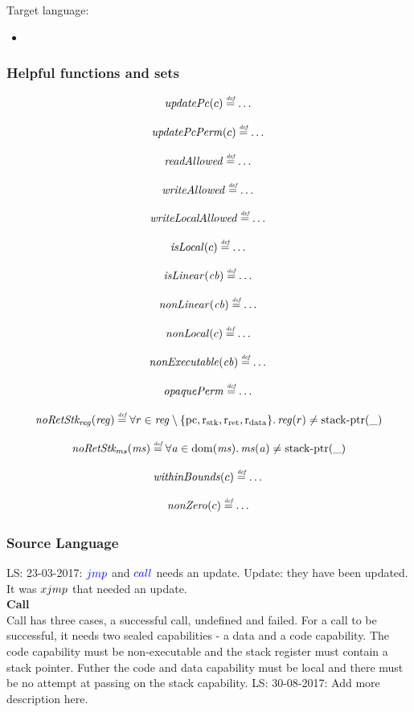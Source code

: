 \documentclass[a4paper]{article}
\newcommand\lau[1]{{\color{purple} \sf \footnotesize {LS: #1}}\\}
\newcommand{\defeq}{\stackrel{\textit{\tiny{def}}}{=}}
\newcommand{\dom}{\mathrm{dom}}
\newcommand{\sourcecolor}[1]{\color{blue}}
\newcommand{\src}[1]{{\sourcecolor{} #1}}
\newcommand{\targetcolor}[1]{\color{black}}
\newcommand{\trg}[1]{{\targetcolor{} #1}}
\newcommand{\zinstr}[1]{#1}
\newcommand{\oneinstr}[2]{
  \ifthenelse{\equal{#2}{}}
  {\zinstr{#1}}
  {\zinstr{#1} \; #2}
}
\newcommand{\twoinstr}[3]{
  \ifthenelse{\equal{#2#3}{}}
  {\zinstr{#1}}
  {\zinstr{#1} \; #2 \; #3}
}
\newcommand{\sjmp}[1]{\oneinstr{\src{jmp}}{#1}}
\newcommand{\scall}[2]{\twoinstr{\src{call}}{#1}{#2}}
\newcommand{\sxjmp}[2]{\twoinstr{\trg{xjmp}}{#1}{#2}}
\newcommand{\stkptr}[1]{\mathrm{stack\text{-}ptr}(#1)}
\newcommand{\var}[1]{\mathit{#1}}
\newcommand{\reg}{\var{reg}}
\newcommand{\ms}{\var{ms}}
\newcommand{\cb}{\var{cb}}
\newcommand{\aaddr}{\var{a}}
\newcommand{\pcreg}{\mathrm{pc}}
\newcommand{\rstk}{\mathrm{r}_\mathrm{stk}}
\newcommand{\rO}{\mathrm{r}_\mathrm{ret}}
\newcommand{\rret}{\rO}
\newcommand{\rdata}{\mathrm{r}_\mathrm{data}}
\newcommand{\plainfun}[2]{
  \ifthenelse{\equal{#2}{}}
  {\mathit{#1}}
  {\mathit{#1}(#2)}
}
\newcommand{\updPcAddr}[1]{\plainfun{updatePc}{#1}}
\newcommand{\updPcPerm}[1]{\plainfun{updatePcPerm}{#1}}
\newcommand{\nonExec}[1]{\plainfun{nonExecutable}{#1}}
\newcommand{\opaquePerm}[1]{\plainfun{opaquePerm}{#1}}
\newcommand{\readAllowed}[1]{\plainfun{readAllowed}{#1}}
\newcommand{\writeAllowed}[1]{\plainfun{writeAllowed}{#1}}
\newcommand{\writeLocalAllowed}[1]{\plainfun{writeLocalAllowed}{#1}}
\newcommand{\nonLoc}[1]{\plainfun{nonLocal}{#1}}
\newcommand{\nonLinear}[1]{\plainfun{nonLinear}{#1}}
\newcommand{\isLoc}[1]{\plainfun{isLocal}{#1}}
\newcommand{\isLinear}[1]{\plainfun{isLinear}{#1}}
\newcommand{\noRetStkReg}[1]{\plainfun{noRetStk_{reg}}{#1}}
\newcommand{\noRetStkMs}[1]{\plainfun{noRetStk_{ms}}{#1}}
\newcommand{\withinBounds}[1]{\plainfun{withinBounds}{#1}}
\newcommand{\nonZero}[1]{\plainfun{nonZero}{#1}}
\begin{document}
Target language:
\begin{itemize}
\item 
\end{itemize}

\subsubsection{Helpful functions and sets}


\[
  \updPcAddr{c} \defeq \dots
\]

\[
  \updPcPerm{c} \defeq \dots
\]

\[
  \readAllowed{} \defeq \dots
\]

\[
  \writeAllowed{} \defeq \dots
\]

\[
  \writeLocalAllowed{} \defeq \dots
\]

\[
  \isLoc{c} \defeq \dots
\]

\[
  \isLinear{\cb} \defeq \dots
\]

\[
  \nonLinear{\cb} \defeq \dots
\]

\[
  \nonLoc{c} \defeq \dots
\]

\[
  \nonExec{\cb} \defeq \dots
\]

\[
  \opaquePerm{} \defeq \dots
\]

\[
  \noRetStkReg{\reg} \defeq \forall r \in \reg \setminus \{ \pcreg, \rstk, \rret, \rdata \} \ldotp \reg(r) \neq \stkptr{\_}
\]

\[
  \noRetStkMs{\ms} \defeq \forall \aaddr \in \dom(\ms) \ldotp \ms(\aaddr) \neq \stkptr{\_}
\]

\[
  \withinBounds{c} \defeq \dots
\]

\[
  \nonZero{c} \defeq \dots
\]


\subsubsection{Source Language}
\lau{23-03-2017: $\sjmp{}$ and $\scall{}{}$ needs an update. Update: they have been updated. It was $\sxjmp{}{}$ that needed an update.}

\textbf{Call}\\
Call has three cases, a successful call, undefined and failed. For a call to be successful, it needs two sealed capabilities - a data and a code capability. The code capability must be non-executable and the stack register must contain a stack pointer. Futher the code and data capability must be local and there must be no attempt at passing on the stack capability.
\lau{30-08-2017: Add more description here.}
\end{document}
